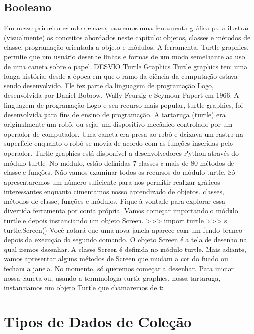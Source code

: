 			\subsection{Booleano}
			Em nosso primeiro estudo de caso, usaremos uma ferramenta gráfica para ilustrar (visualmente)
			os conceitos abordados neste capítulo: objetos, classes e métodos de classe, programação
			orientada a objeto e módulos. A ferramenta, Turtle graphics, permite que um usuário desenhe
			linhas e formas de um modo semelhante ao uso de uma caneta sobre o papel.
			DESVIO Turtle Graphics
			Turtle graphics tem uma longa história, desde a época em que o ramo da
			ciência da computação estava sendo desenvolvido. Ele fez parte da linguagem
			de programação Logo, desenvolvida por Daniel Bobrow, Wally Feurzig e
			Seymour Papert em 1966. A linguagem de programação Logo e seu recurso
			mais popular, turtle graphics, foi desenvolvida para fins de ensino de
			programação.
			A tartaruga (turtle) era originalmente um robô, ou seja, um dispositivo
			mecânico controlado por um operador de computador. Uma caneta era presa
			ao robô e deixava um rastro na superfície enquanto o robô se movia de acordo
			com as funções inseridas pelo operador.
			Turtle graphics está disponível a desenvolvedores Python através do módulo turtle. No
			módulo, estão definidas 7 classes e mais de 80 métodos de classe e funções. Não vamos examinar
			todos os recursos do módulo turtle. Só apresentaremos um número suficiente para nos permitir
			realizar gráficos interessantes enquanto cimentamos nosso aprendizado de objetos, classes,
			métodos de classe, funções e módulos. Fique à vontade para explorar essa divertida ferramenta
			por conta própria.
			Vamos começar importando o módulo turtle e depois instanciando um objeto Screen.
			>>> import turtle
			>>> s = turtle.Screen()
			Você notará que uma nova janela aparece com um fundo branco depois da execução do segundo
			comando. O objeto Screen é a tela de desenho na qual iremos desenhar. A classe Screen é
			definida no módulo turtle. Mais adiante, vamos apresentar alguns métodos de Screen que
			mudam a cor do fundo ou fecham a janela. No momento, só queremos começar a desenhar.
			Para iniciar nossa caneta ou, usando a terminologia turtle graphics, nossa tartaruga,
			instanciamos um objeto Turtle que chamaremos de t:
	
    \section{Tipos de Dados de Cole\c{c}\~{a}o}


